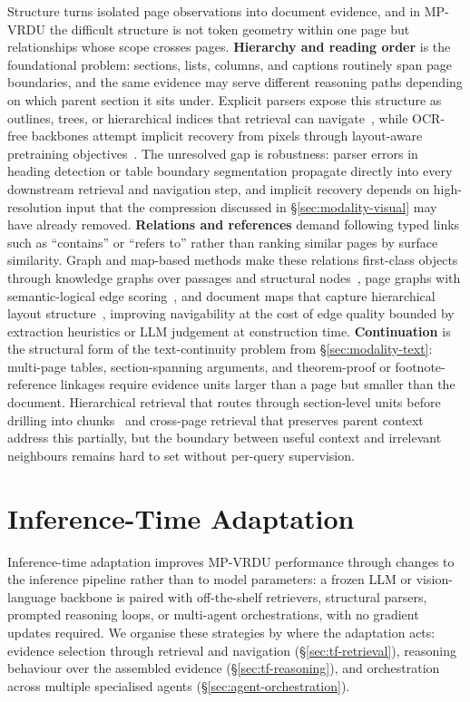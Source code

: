 \documentclass[11pt]{article}
\begin{document}
Structure turns isolated page observations into document evidence, and in MP-VRDU the difficult structure is not token geometry within one page but relationships whose scope crosses pages. \textbf{Hierarchy and reading order} is the foundational problem: sections, lists, columns, and captions routinely span page boundaries, and the same evidence may serve different reasoning paths depending on which parent section it sits under. Explicit parsers expose this structure as outlines, trees, or hierarchical indices that retrieval can navigate~\cite{shin2025multidocfusion,sun2025docagent}, while OCR-free backbones attempt implicit recovery from pixels through layout-aware pretraining objectives~\cite{yu2024texthawk2,hu2025mplugdocowl2}. The unresolved gap is robustness: parser errors in heading detection or table boundary segmentation propagate directly into every downstream retrieval and navigation step, and implicit recovery depends on high-resolution input that the compression discussed in \S\ref{sec:modality-visual} may have already removed. \textbf{Relations and references} demand following typed links such as ``contains'' or ``refers to'' rather than ranking similar pages by surface similarity. Graph and map-based methods make these relations first-class objects through knowledge graphs over passages and structural nodes~\cite{wang2024knowledge}, page graphs with semantic-logical edge scoring~\cite{wu2025molorag}, and document maps that capture hierarchical layout structure~\cite{fu2026dmap}, improving navigability at the cost of edge quality bounded by extraction heuristics or LLM judgement at construction time. \textbf{Continuation} is the structural form of the text-continuity problem from \S\ref{sec:modality-text}: multi-page tables, section-spanning arguments, and theorem-proof or footnote-reference linkages require evidence units larger than a page but smaller than the document. Hierarchical retrieval that routes through section-level units before drilling into chunks~\cite{gong2025mhierrag} and cross-page retrieval that preserves parent context~\cite{qian2026accurate} address this partially, but the boundary between useful context and irrelevant neighbours remains hard to set without per-query supervision.

\section{Inference-Time Adaptation}
\label{sec:inference-time}

Inference-time adaptation improves MP-VRDU performance through changes to the inference pipeline rather than to model parameters: a frozen LLM or vision-language backbone is paired with off-the-shelf retrievers, structural parsers, prompted reasoning loops, or multi-agent orchestrations, with no gradient updates required. We organise these strategies by where the adaptation acts: evidence selection through retrieval and navigation (\S\ref{sec:tf-retrieval}), reasoning behaviour over the assembled evidence (\S\ref{sec:tf-reasoning}), and orchestration across multiple specialised agents (\S\ref{sec:agent-orchestration}).
\end{document}
